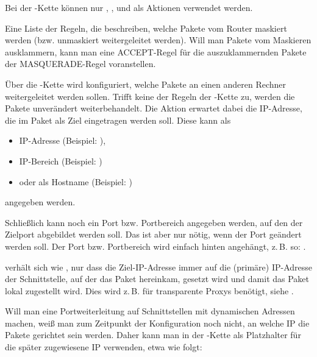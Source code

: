 Bei der -Kette können nur ,
,  und  als Aktionen
verwendet werden.

\begin{description}

\mbox{}\newline
Eine Liste der Regeln, die beschreiben, welche Pakete vom Router maskiert
werden (bzw. unmaskiert weitergeleitet werden). Will man Pakete vom
Maskieren ausklammern, kann man eine ACCEPT-Regel für die
auszuklammernden Pakete der MASQUERADE-Regel voranstellen.

\end{description}

Über die -Kette wird konfiguriert, welche Pakete an einen
anderen Rechner weitergeleitet werden sollen. Trifft keine der Regeln
der -Kette zu, werden die Pakete unverändert
weiterbehandelt. Die Aktion  erwartet dabei die IP-Adresse, die
im Paket als Ziel eingetragen werden soll. Diese kann als
\begin{itemize}
\item IP-Adresse (Beispiel: ),
\item IP-Bereich (Beispiel: )
\item oder als Hostname (Beispiel: )
\end{itemize}
angegeben werden.

Schließlich kann noch ein Port bzw. Portbereich angegeben werden, auf den der
Zielport abgebildet werden soll. Das ist aber nur nötig, wenn der Port geändert
werden soll. Der Port bzw. Portbereich wird einfach hinten angehängt, z.\,B.
so:
.

 verhält sich wie , nur dass die
Ziel-IP-Adresse immer auf die (primäre) IP-Adresse der Schnittstelle, auf der das
Paket hereinkam, gesetzt wird und damit das Paket lokal zugestellt wird. Dies
wird z.\,B. für transparente Proxys benötigt, siehe
.

Will man eine Portweiterleitung auf Schnittstellen mit dynamischen Adressen
machen, weiß man zum Zeitpunkt der Konfiguration noch nicht, an welche IP die
Pakete gerichtet sein werden. Daher kann man in der -Kette
 als Platzhalter für die später zugewiesene IP verwenden, etwa
wie folgt:

